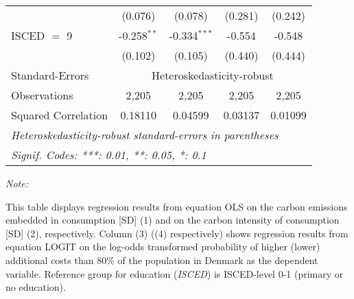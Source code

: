 \begin{table}[htbp!]
\begin{adjustbox}{width = 1\textwidth, max height = 0.95\textheight, center}
\begin{threeparttable}[b]
\begin{tabular}{lcccc}
                                 & (0.076)            & (0.078)            & (0.281)        & (0.242)\\   
            ISCED $=$ 9          & -0.258$^{**}$      & -0.334$^{***}$     & -0.554         & -0.548\\   
                                 & (0.102)            & (0.105)            & (0.440)        & (0.444)\\   
            \midrule 
            Standard-Errors & \multicolumn{4}{c}{Heteroskedasticity-robust} \\ 
            Observations         & 2,205              & 2,205              & 2,205          & 2,205\\  
            Squared Correlation  & 0.18110            & 0.04599            & 0.03137        & 0.01099\\  
            \midrule \midrule
            \multicolumn{5}{l}{\emph{Heteroskedasticity-robust standard-errors in parentheses}}\\
            \multicolumn{5}{l}{\emph{Signif. Codes: ***: 0.01, **: 0.05, *: 0.1}}\\
         \end{tabular}
         
         \begin{tablenotes}\item \medskip \textit{Note:}
            \item This table displays regression results from equation OLS on the carbon emissions embedded in consumption [SD] (1) and on the carbon intensity of consumption [SD] (2), respectively. 
                                      Column (3) ((4) respectively) shows regression results from equation LOGIT on the log-odds transformed probability of higher (lower) additional costs than 80\% of the population in Denmark as the dependent variable. Reference group for education (\textit{ISCED}) is ISCED-level 0-1 (primary or no education).
         \end{tablenotes}
      \end{threeparttable}
   \end{adjustbox}
\end{table}



